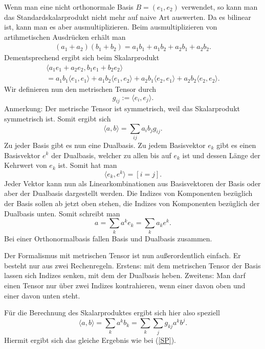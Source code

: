\documentclass[a4paper,12pt,fleqn]{article}
\begin{document}
Wenn man eine nicht orthonormale Basis $B=(e_1,e_2)$ verwendet,
so kann man das Standardskalarprodukt nicht mehr auf naive Art
auswerten. Da es bilinear ist, kann man es aber ausmultiplizieren.
Beim ausmultiplizieren von artihmetischen Ausdrücken erhält man
\begin{gather*}
(a_1+a_2)(b_1+b_2)
= a_1b_1+a_1b_2+a_2b_1+a_2b_2.
\end{gather*}
Dementsprechend ergibt sich beim Skalarprodukt
\begin{gather*}
\langle a_1e_1+a_2e_2, b_1e_1+b_2e_2\rangle\\
= a_1b_1\langle e_1,e_1\rangle
+ a_1b_2\langle e_1,e_2\rangle
+ a_2b_1\langle e_2,e_1\rangle
+ a_2b_2\langle e_2,e_2\rangle.
\end{gather*}
Wir definieren nun den metrischen Tensor durch
\begin{equation}
g_{ij} := \langle e_i,e_j\rangle.
\end{equation}
Anmerkung: Der metrische Tensor ist symmetrisch, weil das
Skalarprodukt symmetrisch ist. Somit ergibt sich
\begin{equation}\label{SP}
\langle a,b\rangle =  \sum_{ij} a_ib_j g_{ij}.
\end{equation}
Zu jeder Basis gibt es nun eine Dualbasis. Zu jedem Basisvektor
$e_k$ gibt es einen Basisvektor $e^k$ der Dualbasis, welcher
zu allen bis auf $e_k$ ist und dessen Länge der Kehrwert
von $e_k$ ist. Somit hat man
\begin{equation}\label{dual}
\langle e_k,e^k\rangle = [i=j].
\end{equation}
Jeder Vektor kann nun als Linearkombinationen aus Basisvektoren
der Basis oder aber der Dualbasis dargestellt werden. Die Indizes
von Komponenten bezüglich der Basis sollen ab jetzt oben stehen,
die Indizes von Komponenten bezüglich der Dualbasis unten. Somit
schreibt man
\begin{equation}
a = \sum_k a^k e_k = \sum_k a_k e^k.
\end{equation}
Bei einer Orthonormalbasis fallen Basis und Dualbasis zusammen.

Der Formalismus mit metrischen Tensor ist nun außerordentlich
einfach. Er besteht nur aus zwei Rechenregeln. Erstens: mit dem
metrischen Tensor der Basis lassen sich Indizes senken, mit dem
der Dualbasis heben. Zweitens: Man darf einen Tensor nur über zwei
Indizes kontrahieren, wenn einer davon oben und einer davon unten
steht.

Für die Berechnung des Skalarproduktes ergibt sich hier also
speziell
\begin{equation}
\langle a,b\rangle = \sum_k a^k b_k
= \sum_k \sum_j g_{kj} a^k b^j.
\end{equation}
Hiermit ergibt sich das gleiche Ergebnis wie bei (\ref{SP}).
\end{document}
